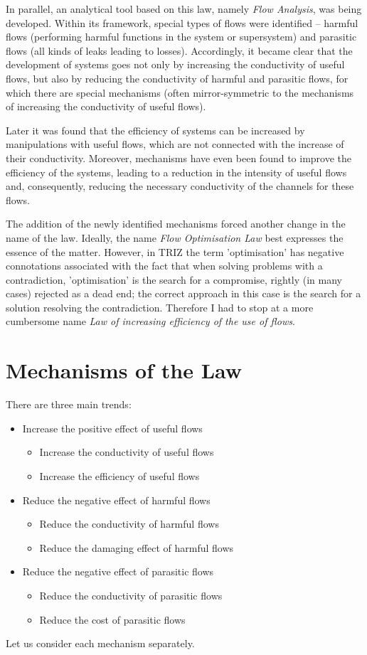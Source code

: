 \documentclass[a4paper,11pt]{article}
\begin{document}
In parallel, an analytical tool based on this law, namely \emph{Flow
  Analysis}, was being developed. Within its framework, special types of flows
were identified -- harmful flows (performing harmful functions in the system
or supersystem) and parasitic flows (all kinds of leaks leading to losses).
Accordingly, it became clear that the development of systems goes not only by
increasing the conductivity of useful flows, but also by reducing the
conductivity of harmful and parasitic flows, for which there are special
mechanisms (often mirror-symmetric to the mechanisms of increasing the
conductivity of useful flows).

Later it was found that the efficiency of systems can be increased by
manipulations with useful flows, which are not connected with the increase of
their conductivity. Moreover, mechanisms have even been found to improve the
efficiency of the systems, leading to a reduction in the intensity of useful
flows and, consequently, reducing the necessary conductivity of the channels
for these flows.

The addition of the newly identified mechanisms forced another change in the
name of the law. Ideally, the name \emph{Flow Optimisation Law} best expresses
the essence of the matter. However, in TRIZ the term 'optimisation' has
negative connotations associated with the fact that when solving problems with
a contradiction, 'optimisation' is the search for a compromise, rightly (in
many cases) rejected as a dead end; the correct approach in this case is the
search for a solution resolving the contradiction. Therefore I had to stop at
a more cumbersome name \emph{Law of increasing efficiency of the use of
  flows}.

\section*{Mechanisms of the Law}

There are three main trends:
\begin{itemize}
\item Increase the positive effect of useful flows
  \begin{itemize}
  \item Increase the conductivity of useful flows
  \item Increase the efficiency of useful flows
  \end{itemize}
\item Reduce the negative effect of harmful flows
  \begin{itemize}
  \item Reduce the conductivity of harmful flows
  \item Reduce the damaging effect of harmful flows
  \end{itemize}
\item Reduce the negative effect of parasitic flows
  \begin{itemize}
  \item Reduce the conductivity of parasitic flows
  \item Reduce the cost of parasitic flows
  \end{itemize}
\end{itemize}
Let us consider each mechanism separately.
\end{document}
